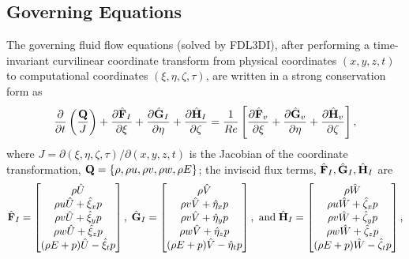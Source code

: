 \documentclass[aps,pra,preprint,groupedaddress]{revtex4-1}
\newcommand{\pd}[2]{\dfrac{\partial #1}{\partial #2}}
\renewcommand{\=}[1]{\stackrel{#1}{=}} %
\begin{document}
\subsection{Governing Equations}
\label{sec:geqs}
The governing fluid flow equations (solved by FDL3DI), after performing a
time-invariant curvilinear coordinate transform from physical coordinates
$(x,y,z,t)$ to computational coordinates $(\xi, \eta, \zeta, \tau)$, are
written in a strong conservation form as
%
\begin{equation}
  \pd{}{t}\left( \frac{\bf Q}{J} \right) + \pd{\hat{\bf F}_I}{\xi} + \pd{\hat{\bf G}_I}{\eta} + \pd{\hat{\bf H}_I}{\zeta} 
  = \frac{1}{Re} 
  \left[ 
    \pd{\hat{\bf F}_v}{\xi} + \pd{\hat{\bf G}_v}{\eta} + \pd{\hat{\bf H}_v}{\zeta}
  \right],
  \label{eq:geq_FDL}
\end{equation}
%
where $J=\partial(\xi,\eta,\zeta,\tau)/\partial(x,y,z,t)$ is the Jacobian of
the coordinate transformation, ${\bf Q}= \{\rho, \rho u, \rho v, \rho w, \rho
E\}$; the inviscid flux terms, $\hat{\bf F}_I,\hat{\bf G}_I,\hat{\bf H}_I$ are
%
\begin{equation}
  \hat{\bf F}_I  = 
      \begin{bmatrix}
        \rho \hat{U} \\
        \rho u \hat{U} + \hat{\xi}_x p  \\
        \rho v \hat{U} + \hat{\xi}_y p  \\
        \rho w \hat{U} + \hat{\xi}_z p  \\
        (\rho E + p) \hat{U} - \hat{\xi}_t p \\
      \end{bmatrix}, \;
  \hat{\bf G}_I = 
      \begin{bmatrix}
        \rho \hat{V} \\
        \rho v \hat{V} + \hat{\eta}_x p  \\
        \rho v \hat{V} + \hat{\eta}_y p  \\
        \rho w \hat{V} + \hat{\eta}_z p  \\
        (\rho E + p) \hat{V} - \hat{\eta}_t p \\
      \end{bmatrix}, ~{\rm and} \;
  \hat{\bf H}_I = 
      \begin{bmatrix}
        \rho \hat{W} \\
        \rho u \hat{W} + \hat{\zeta}_x p  \\
        \rho v \hat{W} + \hat{\zeta}_y p  \\
        \rho w \hat{W} + \hat{\zeta}_z p  \\
        (\rho E + p) \hat{W} - \hat{\zeta}_t p \\
      \end{bmatrix},
      \label{eq:inviscidFluxes}
\end{equation}
\end{document}
